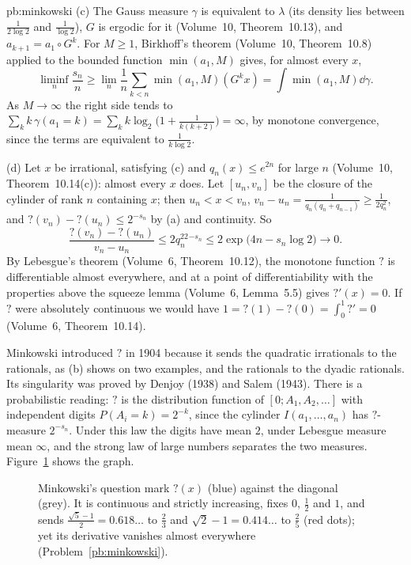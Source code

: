 \begin{solution}{pb:minkowski}
(c) The Gauss measure $\gamma$ is equivalent to $\lambda$ (its density lies between $\frac1{2\log2}$ and $\frac1{\log2}$), $G$ is ergodic for it (Volume~10, Theorem~10.13),
and $a_{k+1}=a_1\circ G^k$. For $M\ge1$, Birkhoff's theorem (Volume~10, Theorem~10.8) applied to the bounded function $\min(a_1,M)$ gives, for almost every $x$,
\[
\liminf_n\frac{s_n}n\ge\lim_n\frac1n\sum_{k<n}\min(a_1,M)(G^kx)=\int\min(a_1,M)\dd\gamma.
\]
As $M\to\infty$ the right side tends to $\sum_kk\,\gamma(a_1=k)=\sum_kk\log_2\bigl(1+\frac1{k(k+2)}\bigr)=\infty$, by monotone convergence, since the terms are
equivalent to $\frac1{k\log2}$.

(d) Let $x$ be irrational, satisfying (c) and $q_n(x)\le e^{2n}$ for large $n$ (Volume~10, Theorem~10.14(c)): almost every $x$ does. Let $[u_n,v_n]$ be the closure of the
cylinder of rank $n$ containing $x$; then $u_n<x<v_n$, $v_n-u_n=\frac1{q_n(q_n+q_{n-1})}\ge\frac1{2q_n^2}$, and $?(v_n)-?(u_n)\le2^{-s_n}$ by (a) and continuity. So
\[
\frac{?(v_n)-?(u_n)}{v_n-u_n}\le2q_n^22^{-s_n}\le2\exp\bigl(4n-s_n\log2\bigr)\longrightarrow0.
\]
By Lebesgue's theorem (Volume~6, Theorem~10.12), the monotone function $?$ is differentiable almost everywhere, and at a point of differentiability with the properties above
the squeeze lemma (Volume~6, Lemma~5.5) gives $?'(x)=0$. If $?$ were absolutely continuous we would have $1=?(1)-?(0)=\int_0^1?'=0$ (Volume~6, Theorem~10.14).

\leads Minkowski introduced $?$ in 1904 because it sends the quadratic irrationals to the rationals, as (b) shows on two examples, and the rationals to the dyadic
rationals. Its singularity was proved by Denjoy (1938) and Salem (1943). There is a probabilistic reading: $?$ is the distribution function of $[0;A_1,A_2,\dots]$ with
independent digits $P(A_i=k)=2^{-k}$, since the cylinder $I(a_1,\dots,a_n)$ has $?$-measure $2^{-s_n}$. Under this law the digits have mean $2$, under Lebesgue measure
mean $\infty$, and the strong law of large numbers separates the two measures. Figure~\ref{fig:minkowski} shows the graph.
\end{solution}

\begin{figure}[ht]
\centering
{}
\caption{Minkowski's question mark $?(x)$ (blue) against the diagonal (grey). It is continuous and strictly increasing, fixes $0$, $\frac12$ and $1$, and sends
$\frac{\sqrt5-1}2=0.618\ldots$ to $\frac23$ and $\sqrt2-1=0.414\ldots$ to $\frac25$ (red dots); yet its derivative vanishes almost everywhere
(Problem~\ref{pb:minkowski}).}\label{fig:minkowski}
\end{figure}

